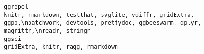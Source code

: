 \documentclass[
  letterpaper,
  DIV=11,
  numbers=noendperiod]{scrreprt}
\begin{document}
\begin{verbatim}
ggrepel                                                                                                                                                                                                                                                                                                                                                                                                                                                                                                                                                                                                                                                                                                                                                                                                                                                                                                                                                                                                                                                                                                                                                           knitr, rmarkdown, testthat, svglite, vdiffr, gridExtra, ggpp,\npatchwork, devtools, prettydoc, ggbeeswarm, dplyr, magrittr,\nreadr, stringr
ggsci                                                                                                                                                                                                                                                                                                                                                                                                                                                                                                                                                                                                                                                                                                                                                                                                                                                                                                                                                                                                                                                                                                                                                                                                                                                                       gridExtra, knitr, ragg, rmarkdown

\end{verbatim}
\end{document}
